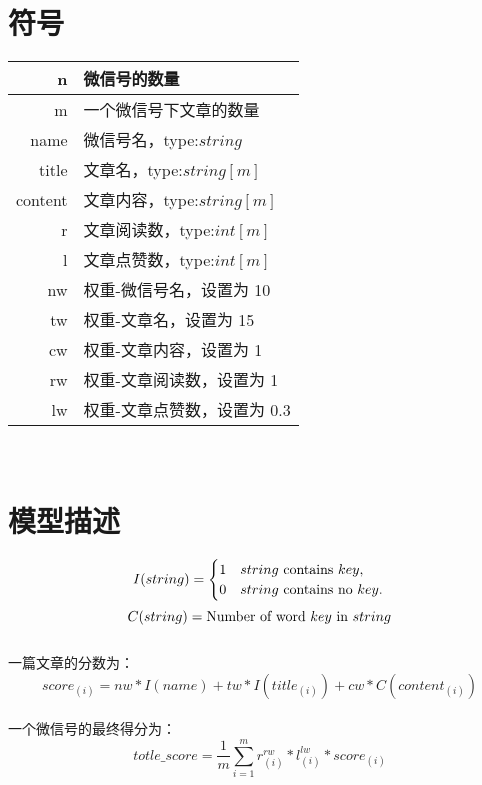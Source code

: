 \documentclass{article}
\begin{document}
\section{符号}
\begin{tabular}{|r|l|}
\hline
n & 微信号的数量\\
\hline
m & 一个微信号下文章的数量\\
\hline
\hline
name & 微信号名，type:$string$\\
\hline
title & 文章名，type:$string[m]$\\
\hline
content & 文章内容，type:$string[m]$\\
\hline
r & 文章阅读数，type:$int[m]$\\
\hline
l & 文章点赞数，type:$int[m]$\\
\hline
\hline
nw & 权重-微信号名，设置为 10\\
\hline
tw & 权重-文章名，设置为 15\\
\hline
cw & 权重-文章内容，设置为 1\\
\hline
rw & 权重-文章阅读数，设置为 1\\
\hline
lw & 权重-文章点赞数，设置为 0.3\\
\hline
\end{tabular} \\ 

\section{模型描述}
\begin{equation}
I(string)=\begin{cases}
1 & \text{$string$ contains $key$},\\
0 & \text{$string$ contains no $key$}.
\end{cases}\\
\end{equation}
\begin{equation}
C(string)=\text{Number of word $key$ in $string$}\\
\end{equation}\\

一篇文章的分数为：\\
\begin{equation}
score_{(i)}=nw*I(name)+tw*I(title_{(i)})+cw*C(content_{(i)})
\end{equation}\\

一个微信号的最终得分为：\\
\begin{equation}
totle\_score=\frac{1}{m}\sum_{i=1}^{m} r_{(i)}^{rw}*l_{(i)}^{lw}*score_{(i)}
\end{equation}
\end{document}
